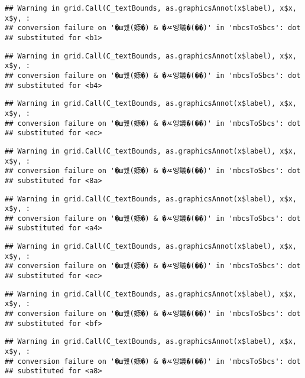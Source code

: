 \documentclass[
]{article}
\begin{document}
\begin{verbatim}
## Warning in grid.Call(C_textBounds, as.graphicsAnnot(x$label), x$x, x$y, :
## conversion failure on '�ш퀬(嫄�) & �ㅼ엥議�(��)' in 'mbcsToSbcs': dot
## substituted for <b1>
\end{verbatim}

\begin{verbatim}
## Warning in grid.Call(C_textBounds, as.graphicsAnnot(x$label), x$x, x$y, :
## conversion failure on '�ш퀬(嫄�) & �ㅼ엥議�(��)' in 'mbcsToSbcs': dot
## substituted for <b4>
\end{verbatim}

\begin{verbatim}
## Warning in grid.Call(C_textBounds, as.graphicsAnnot(x$label), x$x, x$y, :
## conversion failure on '�ш퀬(嫄�) & �ㅼ엥議�(��)' in 'mbcsToSbcs': dot
## substituted for <ec>
\end{verbatim}

\begin{verbatim}
## Warning in grid.Call(C_textBounds, as.graphicsAnnot(x$label), x$x, x$y, :
## conversion failure on '�ш퀬(嫄�) & �ㅼ엥議�(��)' in 'mbcsToSbcs': dot
## substituted for <8a>
\end{verbatim}

\begin{verbatim}
## Warning in grid.Call(C_textBounds, as.graphicsAnnot(x$label), x$x, x$y, :
## conversion failure on '�ш퀬(嫄�) & �ㅼ엥議�(��)' in 'mbcsToSbcs': dot
## substituted for <a4>
\end{verbatim}

\begin{verbatim}
## Warning in grid.Call(C_textBounds, as.graphicsAnnot(x$label), x$x, x$y, :
## conversion failure on '�ш퀬(嫄�) & �ㅼ엥議�(��)' in 'mbcsToSbcs': dot
## substituted for <ec>
\end{verbatim}

\begin{verbatim}
## Warning in grid.Call(C_textBounds, as.graphicsAnnot(x$label), x$x, x$y, :
## conversion failure on '�ш퀬(嫄�) & �ㅼ엥議�(��)' in 'mbcsToSbcs': dot
## substituted for <bf>
\end{verbatim}

\begin{verbatim}
## Warning in grid.Call(C_textBounds, as.graphicsAnnot(x$label), x$x, x$y, :
## conversion failure on '�ш퀬(嫄�) & �ㅼ엥議�(��)' in 'mbcsToSbcs': dot
## substituted for <a8>
\end{verbatim}
\end{document}
